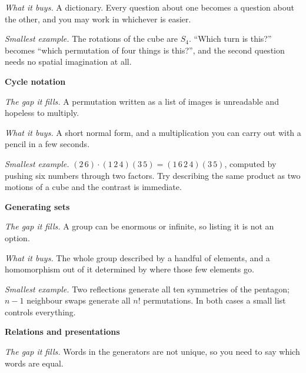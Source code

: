 \documentclass[10pt]{article}
\begin{document}
{\begin{minipage}[t]{744pt}
\begin{minipage}[t]{238pt}
\emph{What it buys.} A dictionary. Every question about one becomes a question about the other, and you may work in whichever is easier.\par\vspace{1pt}
\emph{Smallest example.} The rotations of the cube are $S_4$. ``Which turn is this?'' becomes ``which permutation of four things is this?'', and the second question needs no spatial imagination at all.
\end{minipage}\hfill
\begin{minipage}[t]{238pt}\vspace{0pt}
{\sffamily\bfseries\color{big} Cycle notation}\par\vspace{1pt}
\emph{The gap it fills.} A permutation written as a list of images is unreadable and hopeless to multiply.\par\vspace{1pt}
\emph{What it buys.} A short normal form, and a multiplication you can carry out with a pencil in a few seconds.\par\vspace{1pt}
\emph{Smallest example.} $(2\,6)\cdot(1\,2\,4)(3\,5)=(1\,6\,2\,4)(3\,5)$, computed by pushing six numbers through two factors. Try describing the same product as two motions of a cube and the contrast is immediate.\par\vspace{5pt}
{\sffamily\bfseries\color{big} Generating sets}\par\vspace{1pt}
\emph{The gap it fills.} A group can be enormous or infinite, so listing it is not an option.\par\vspace{1pt}
\emph{What it buys.} The whole group described by a handful of elements, and a homomorphism out of it determined by where those few elements go.\par\vspace{1pt}
\emph{Smallest example.} Two reflections generate all ten symmetries of the pentagon; $n-1$ neighbour swaps generate all $n!$ permutations. In both cases a small list controls everything.\par\vspace{5pt}
{\sffamily\bfseries\color{big} Relations and presentations}\par\vspace{1pt}
\emph{The gap it fills.} Words in the generators are not unique, so you need to say which words are equal.\par\vspace{1pt}

\end{minipage}
\end{minipage}}
\end{document}
